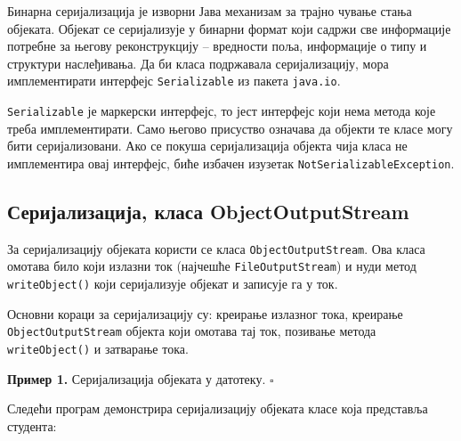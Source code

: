 Бинарна серијализација је изворни Јава механизам за трајно чување стања објеката. Објекат се серијализује у бинарни формат који садржи све информације потребне за његову реконструкцију – вредности поља, информације о типу и структури наслеђивања. Да би класа подржавала серијализацију, мора имплементирати интерфејс \texttt{Serializable} из пакета \texttt{java.io}.

\texttt{Serializable} је маркерски интерфејс, то јест интерфејс који нема метода које треба имплементирати. Само његово присуство означава да објекти те класе могу бити серијализовани. Ако се покуша серијализација објекта чија класа не имплементира овај интерфејс, биће избачен изузетак \texttt{NotSerializableException}.


\subsection{Серијализација, класа ObjectOutputStream}

За серијализацију објеката користи се класа \texttt{ObjectOutputStream}. Ова класа омотава било који излазни ток (најчешће \texttt{FileOutputStream}) и нуди метод \texttt{writeObject()} који серијализује објекат и записује га у ток.

Основни кораци за серијализацију су: креирање излазног тока, креирање \texttt{ObjectOutputStream} објекта који омотава тај ток, позивање метода \texttt{writeObject()} и затварање тока.


\bigskip

\noindent \textbf{Пример 1.} Серијализација објеката у датотеку. $\square$

\medskip

Следећи програм демонстрира серијализацију објеката класе која представља студента:


